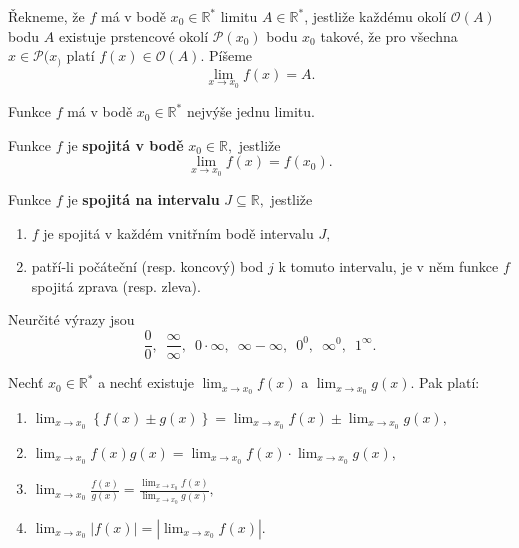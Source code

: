 \begin{definition}
Řekneme, že $f$ má v bodě $x_0\in \mathbb R^*$ limitu $A \in \mathbb R^*$,
jestliže každému okolí $\mathscr O(A)$ bodu $A$ existuje prstencové
okolí $\mathscr P(x_0)$ bodu $x_0$ takové, že pro všechna $x\in \mathscr P(x_)$
platí $f(x)\in \mathscr O(A).$ Píšeme
$$
\lim_{x\to x_0}f(x)=A.
$$
\end{definition}

\begin{veta}
    Funkce $f$ má v bodě $x_0\in \mathbb R^*$ nejvýše jednu limitu.
\end{veta}

\begin{definition}
Funkce $f$ je \textbf{spojitá v bodě} $x_0\in \mathbb R,$ jestliže
$$\lim_{x\to x_0}f(x)=f(x_0).$$
\end{definition}

\begin{definition}
Funkce $f$ je \textbf{spojitá na intervalu} $J\subseteq \mathbb R,$ jestliže
\begin{enumerate}[$i.$]
\item $f$ je spojitá v každém vnitřním bodě intervalu $J,$
\item patří-li počáteční (resp. koncový) bod $j$ k tomuto intervalu,
je v něm funkce $f$ spojitá zprava (resp. zleva).
\end{enumerate}
\end{definition}

\begin{pozn}
Neurčité výrazy jsou
$$\frac{0}{0},  \,\,\, \frac{\infty}{\infty}, \,\,\, 0\cdot \infty, \,\,\, \infty - \infty, \,\,\,0^0,\,\,\, \infty^0,\,\,\, 1^\infty.$$
\end{pozn}

\begin{veta}
Nechť $x_0\in \mathbb R^*$ a nechť existuje $\lim_{x\to x_0}f(x)$ a $\lim_{x\to x_0}g(x)$.
Pak platí:
\begin{enumerate}[$i.$]
\item $\lim_{x\to x_0} \left \{ f(x)\pm g(x) \right \}= \lim_{x\to x_0}f(x) \pm \lim_{x\to x_0}g(x),$
\item $\lim_{x\to x_0}f(x)g(x)=\lim_{x\to x_0}f(x)\cdot \lim_{x\to x_0}g(x),$
\item $\lim_{x\to x_0}\frac{f(x)}{g(x)}=\frac{\lim_{x\to x_0}f(x)}{\lim_{x\to x_0}g(x)},$
\item $\lim_{x\to x_0}|f(x)| = |\lim_{x\to x_0}f(x)|.$
\end{enumerate}
\end{veta}

